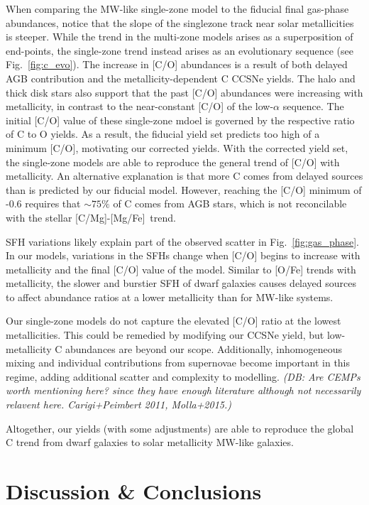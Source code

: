 \documentclass[fleqn,
usenatbib]{mnras}
\newcommand{\caafe}{[C/Mg]-[Mg/Fe]}
\newcommand{\about}[1]{${\sim} #1$}
\newcommand{\dbnote}[1]{ {\color{Thistle} \textit{\small (DB: #1)}} }
\begin{document}
When comparing the MW-like single-zone model to the fiducial final gas-phase abundances, notice that the slope of the singlezone track near solar metallicities is steeper. 
While the trend in the multi-zone models arises as a
superposition of end-points, the single-zone trend instead arises as an evolutionary sequence (see Fig.~\ref{fig:c_evo}). The increase in [C/O] abundances is a result of both delayed AGB contribution and the metallicity-dependent C CCSNe yields.
The halo and thick disk stars also support that the past [C/O] abundances were increasing with metallicity, in contrast to the near-constant [C/O] of the low-$\alpha$ sequence.
The initial [C/O] value of these single-zone mdoel is governed by the respective ratio of C to O yields. As a result, the fiducial yield set predicts too high of a minimum [C/O], motivating our corrected yields. With the corrected yield set, the single-zone models are able to reproduce the general trend of [C/O] with metallicity.
An alternative explanation is that more C comes from delayed sources than is predicted by our fiducial model. However, reaching the [C/O] minimum of -0.6 requires that \about{75\%} of C comes from AGB stars, which is not reconcilable with the stellar \caafe\ trend.  

SFH variations likely explain part of the observed scatter in Fig.~\ref{fig:gas_phase}. 
In our models, variations in the SFHs change when [C/O] begins to increase with metallicity and the final [C/O] value of the model. Similar to [O/Fe] trends with metallicity, the slower and burstier SFH of dwarf galaxies causes delayed sources to affect abundance ratios at a lower metallicity than for MW-like systems.

Our single-zone models do not capture the elevated [C/O] ratio at the lowest metallicities. This could be remedied by modifying our CCSNe yield, but low-metallicity C abundances are beyond our scope. Additionally, inhomogeneous mixing and individual contributions from supernovae become important in this regime, adding additional scatter and complexity to modelling.
\dbnote{Are CEMPs worth mentioning here? since they have enough literature although not necessarily relavent here. Carigi+Peimbert 2011, Molla+2015.}

Altogether, our yields (with some adjustments) are able to reproduce the global C trend from dwarf galaxies to solar metallicity MW-like galaxies. 




\section{Discussion \& Conclusions}\label{sec:conclusions}
\end{document}

